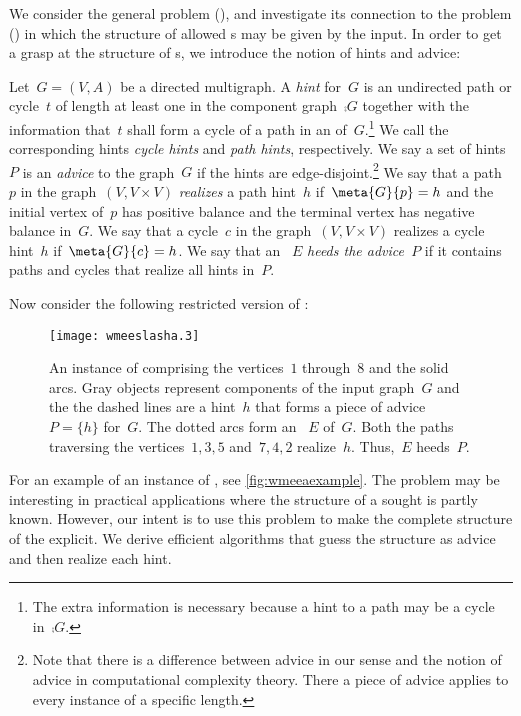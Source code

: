 We consider the general problem \pWMEE{} (\pWMEEs{}), and investigate its connection to the problem \pWMEEA{} (\pWMEEAs{}) in which the structure of allowed \EE s may be given by the input. In order to get a grasp at the structure of \EE s, we introduce the notion of hints and advice:
\begin{definition}
  Let~$G=(V, A)$ be a directed multigraph. A \emph{hint} for~$G$ is an undirected path or cycle~$t$ of length at least one in the component graph~$\comp{G}$ together with the information that~$t$ shall form a cycle of a path in an \EE{} of~$G$.\footnote{The extra information is necessary because a hint to a path may be a cycle in~$\comp{G}$.} We call the corresponding hints \emph{cycle hints} and \emph{path hints}, respectively. We say a set of hints~$P$ is an \emph{advice} to the graph~$G$ if the hints are edge-disjoint.\footnote{Note that there is a difference between advice in our sense and the notion of advice in computational complexity theory. There a piece of advice applies to every instance of a specific length.} We say that a path~$p$ in the graph~$(V, V \times V)$ \emph{realizes} a path hint~$h$ if~$\meta{G}{p} = h$ and the initial vertex of~$p$ has positive balance and the terminal vertex has negative balance in~$G$. We say that a cycle~$c$ in the graph~$(V, V \times V)$ realizes a cycle hint~$h$ if~$\meta{G}{c} = h$. We say that an \EE~$E$ \emph{heeds the advice~$P$} if it contains paths and cycles that realize all hints in~$P$.
\end{definition}
Now consider the following restricted version of \pWMEEs{}:
\begin{figure}
  \begin{center}
    \texttt{[image: wmeeslasha.3]}
    \caption{An instance of \pWMEEAs{} comprising the vertices~$1$ through~$8$ and the solid arcs. Gray objects represent components of the input graph~$G$ and the the dashed lines are a hint~$h$ that forms a piece of advice~$P = \{h\}$ for~$G$. The dotted arcs form an \EE{}~$E$ of~$G$. Both the paths traversing the vertices~$1, 3, 5$ and~$7, 4, 2$ realize~$h$. Thus,~$E$ heeds~$P$.}
    \label{fig:wmeeaexample}
  \end{center}
\end{figure}For an example of an instance of \pWMEEAs{}, see \autoref{fig:wmeeaexample}. The \pWMEEAs{} problem may be interesting in practical applications where the structure of a sought \EE{} is partly known. However, our intent is to use this problem to make the complete structure of the \EE{} explicit. We derive efficient algorithms that guess the structure as advice and then realize each hint.

